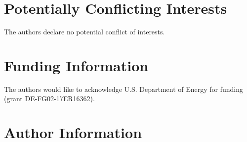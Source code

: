 \documentclass[9pt,tutorial]{livecoms}
\begin{document}
\section{Potentially Conflicting Interests}

The authors declare no potential conflict of interests.

\section{Funding Information}
The authors would like to acknowledge U.S. Department of Energy for funding (grant DE-FG02-17ER16362).

\section*{Author Information}
\makeorcid




\end{document}
